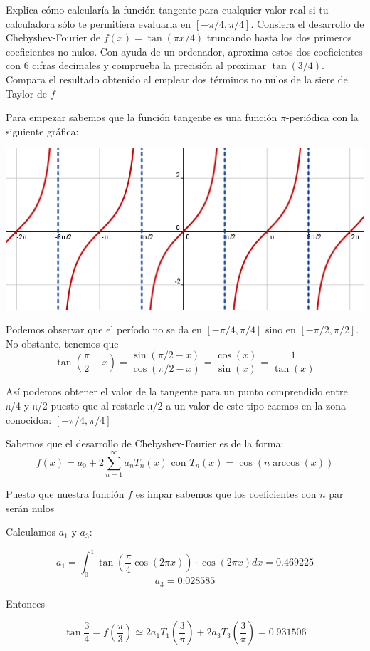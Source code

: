 \begin{problem}[11]
Explica cómo calcularía la función tangente para cualquier valor real si tu calculadora sólo te permitiera evaluarla en $[-π/4,π/4]$. Consiera el desarrollo de Chebyshev-Fourier de $f(x)=\tan(πx/4)$ truncando hasta los dos primeros coeficientes no nulos. Con ayuda de un ordenador, aproxima estos dos coeficientes con 6 cifras decimales y comprueba la precisión al proximar $\tan (3/4)$. Compara el resultado obtenido al emplear dos términos no nulos de la siere de Taylor de $f$
\solution

Para empezar sabemos que la función tangente es una función $\pi$-periódica con la siguiente gráfica:

\begin{center}
	\includegraphics{img/grafica_tangente.png}
\end{center}

Podemos observar que el período no se da en $[-π/4,π/4]$ sino en $[-π/2,π/2]$. No obstante, tenemos que
\[\tan\left(\frac{π}{2}-x\right)=\frac{\sin(π/2-x)}{\cos(π/2-x)}=\frac{\cos(x)}{\sin(x)}=\frac{1}{\tan(x)}\]

Así podemos obtener el valor de la tangente para un punto comprendido entre π/4 y π/2 puesto que al restarle π/2 a un valor de este tipo caemos en la zona conocidoa: $[-π/4,π/4]$

Sabemos que el desarrollo de Chebyshev-Fourier es de la forma:
\[f(x)=a_0+2\sum_{n=1}^{\infty}a_nT_n(x) \text{ con } T_n(x)=\cos(n \arccos(x))\]

Puesto que nuestra función $f$ es impar sabemos que los coeficientes con $n$ par serán nulos

Calculamos $a_1$ y $a_3$:

\[a_1 = \int_{0}^{1} \tan(\frac{\pi}{4} \cos (2\pi x)) \cdot \cos(2 \pi x) dx = 0.469225\]
\[ a_3 = 0.028585\]

Entonces

\[ \tan\frac{3}{4} = f(\frac{\pi}{3})\simeq 2 a_1 T_1(\frac{3}{\pi}) +2 a_3 T_3 (\frac{3}{\pi}) = 0.931506\]



\end{problem}

